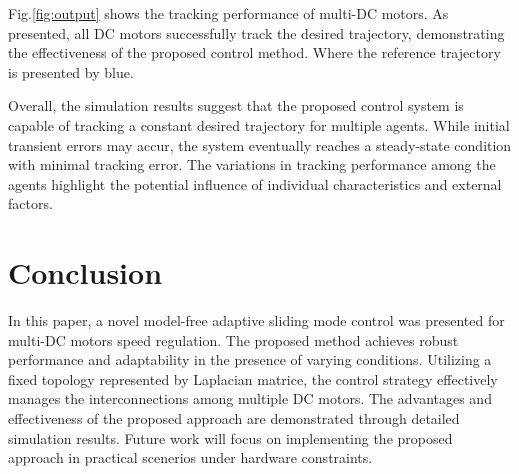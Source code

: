 \documentclass[journal,onecolumn]{IEEEtran}
\begin{document}
Fig.\ref{fig:output} shows the tracking performance of multi-DC motors. As presented, all DC motors successfully track the desired trajectory, demonstrating the effectiveness of the proposed control method. Where the reference trajectory is presented by blue.

Overall, the simulation results suggest that the proposed control system is capable of tracking a constant desired trajectory for multiple agents. While initial transient errors may accur, the system eventually reaches a steady-state condition with minimal tracking error. The variations in tracking performance among the agents highlight the potential influence of individual characteristics and external factors.

\section{Conclusion}

In this paper, a novel model-free adaptive sliding mode control was presented for multi-DC motors speed regulation. The proposed method achieves robust performance and adaptability in the presence of varying conditions. Utilizing a fixed topology represented by Laplacian matrice, the control strategy effectively manages the interconnections among multiple DC motors. The advantages and effectiveness of the proposed approach are demonstrated through detailed simulation results. Future work will focus on implementing the proposed approach in practical scenerios under hardware constraints.








\end{document}
